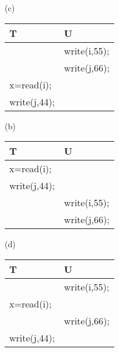 \documentclass{article}
\begin{document}
\begin{tcolorbox}[colback=blue!5!white,colframe=blue!75!black,title=Problem 16.9]
\begin{multicols}{2}
\begin{enumerate}
        \end{enumerate}
        \begin{enumerate}(c)
            \begin{table}[H]
            \begin{tabular}{ll}
            T                                        & U                                   \\ \hline
            \multicolumn{1}{l}{} & \multicolumn{1}{l}{write(i,55);} \\
            \multicolumn{1}{l}{} & \multicolumn{1}{l}{write(j,66);} \\
            x=read(i);           &                                  \\
            write(j,44);         &                      \end{tabular}
            \end{table}
        \end{enumerate}
        \begin{enumerate}(b)
            \begin{table}[H]
            \begin{tabular}{ll}
            T                                        & U                                   \\ \hline
            \multicolumn{1}{l}{x=read(i);}   & \multicolumn{1}{l}{} \\
            \multicolumn{1}{l}{write(j,44);} & \multicolumn{1}{l}{} \\
                                             & write(i,55);         \\
                                             & write(j,66);                    \end{tabular}
            \end{table}
        \end{enumerate}
        \begin{enumerate}(d)
            \begin{table}[H]
            \begin{tabular}{ll}
            T                                        & U                                   \\ \hline
            \multicolumn{1}{l}{}           & \multicolumn{1}{l}{write(i,55);} \\
            \multicolumn{1}{l}{x=read(i);} & \multicolumn{1}{l}{}             \\
                                           & write(j,66);                     \\
            write(j,44);                   &                     \end{tabular}
            \end{table}
        \end{enumerate}

    \end{multicols}
\end{tcolorbox}
\end{document}
